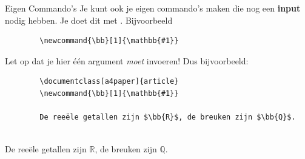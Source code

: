 \begin{frame}[fragile]{Eigen Commando's}
    Je kunt ook je eigen commando's maken die nog een \textbf{input} nodig hebben. 
    Je doet dit met \texttt{\newcommand{\naam}[1]{wat je wil dat het doet}}. 
    Bijvoorbeeld
    \begin{verbatim}
        \newcommand{\bb}[1]{\mathbb{#1}}
    \end{verbatim}
    \pause
    Let op dat je hier één argument \emph{moet} invoeren!
    \pause
    \newcommand{\bb}[1]{\mathbb{#1}}
    Dus bijvoorbeeld:
    \begin{verbatim}
        \documentclass[a4paper]{article}
        \newcommand{\bb}[1]{\mathbb{#1}}
        
        De reeële getallen zijn $\bb{R}$, de breuken zijn $\bb{Q}$. 
        
    \end{verbatim}
    \pause
    \begin{tcolorbox}[boxrule=0.5pt, colback=white]
        De reeële getallen zijn $\bb{R}$, de breuken zijn $\bb{Q}$. 
    \end{tcolorbox}
\end{frame}
